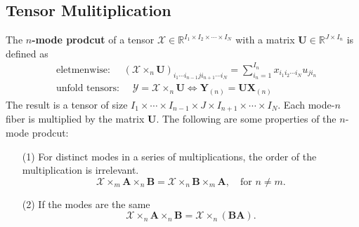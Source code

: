 \documentclass[final]{elsarticle}
\begin{document}
\subsection{Tensor Mulitiplication}
\noindent The \textbf{$n$-mode prodcut} of a tensor $\boldsymbol{\mathscr{X}}\in\mathbb{R}^{I_1\times I_2\times\cdots\times I_N}$
with a matrix $\mathbf{U}\in\mathbb{R}^{J\times I_n}$ is defined as
\begin{subequations}
    \begin{align}
        & \text{eletmenwise: } \quad \left(\boldsymbol{\mathscr{X}}\times_n\mathbf{U}\right)_{i_1\cdots i_{n-1}ji_{n+1}\cdots i_N}
        =\sum_{i_n=1}^{I_n}x_{i_1i_2\cdots i_N}u_{ji_n} \\
        & \text{unfold tensors: } \quad \boldsymbol{\mathscr{Y}} = \boldsymbol{\mathscr{X}}\times_n\mathbf{U}\Leftrightarrow
        \mathbf{Y}_{(n)} = \mathbf{U}\mathbf{X}_{(n)}
    \end{align}
\end{subequations}
The result is a tensor of size $I_1\times\cdots\times I_{n-1}\times J\times I_{n+1}\times\cdots\times I_N$. Each mode-$n$ fiber is multiplied by the matrix $\mathbf{U}$.
The following are some properties of the $n$-mode prodcut:
\begin{enumerate}
    \item[(1)] For distinct modes
    in a series of multiplications, the order of the multiplication is irrelevant.
    \begin{equation}
        \boldsymbol{\mathscr{X}}\times_m\mathbf{A}\times_n\mathbf{B} = \boldsymbol{\mathscr{X}}\times_n\mathbf{B}\times_m\mathbf{A},\quad \text{for } n\neq m.
    \end{equation}
    \item[(2)] If the modes are the same
    \begin{equation}
        \boldsymbol{\mathscr{X}}\times_n\mathbf{A}\times_n\mathbf{B}=\boldsymbol{\mathscr{X}}\times_n(\mathbf{B}\mathbf{A}).
    \end{equation} 
\end{enumerate}
\end{document}
